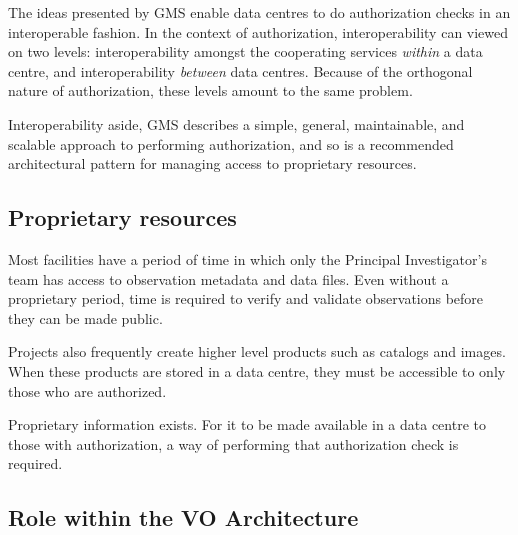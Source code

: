 \documentclass[11pt,a4paper]{ivoa}
\begin{document}
The ideas presented by GMS enable data centres to do authorization checks in an interoperable fashion.  In the context of authorization, interoperability can viewed on two levels:  interoperability amongst the cooperating services \emph{within} a data centre, and interoperability \emph{between} data centres.  Because of the orthogonal nature of authorization, these levels amount to the same problem.

Interoperability aside, GMS describes a simple, general, maintainable, and scalable approach to performing authorization, and so is a recommended architectural pattern for managing access to proprietary resources.

\subsection{Proprietary resources}

Most facilities have a period of time in which only the Principal Investigator's team has access to observation metadata and data files.  Even without a proprietary period, time is required to verify and validate observations before they can be made public.

Projects also frequently create higher level products such as catalogs and images.  When these products are stored in a data centre, they must be accessible to only those who are authorized.

Proprietary information exists.  For it to be made available in a data centre to those with authorization, a way of performing that authorization check is required.

\subsection{Role within the VO Architecture}
\end{document}
